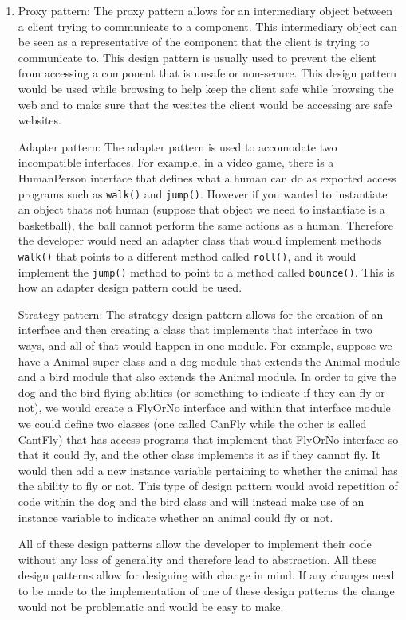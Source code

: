 \documentclass[12pt]{article}
\begin{document}
\begin{enumerate}

\item Proxy pattern: The proxy pattern allows for an intermediary object between a client trying to communicate to a component. This intermediary object can be seen as a representative of the component that the client is trying to communicate to. This design pattern is usually used to prevent the client from accessing a component that is unsafe or non-secure. This design pattern would be used while browsing to help keep the client safe while browsing the web and to make sure that the wesites the client would be accessing are safe websites.

Adapter pattern: The adapter pattern is used to accomodate two incompatible interfaces. For example, in a video game, there is a HumanPerson interface that defines what a human can do as exported access programs such as \verb|walk()| and \verb|jump()|. However if you wanted to instantiate an object thats not human (suppose that object we need to instantiate is a basketball), the ball cannot perform the same actions as a human. Therefore the developer would need an adapter class that would implement methods \verb|walk()| that points to a different method called \verb|roll()|, and it would implement the \verb|jump()| method to point to a method called \verb|bounce()|. This is how an adapter design pattern could be used.

Strategy pattern: The strategy design pattern allows for the creation of an interface and then creating a class that implements that interface in two ways, and all of that would happen in one module. For example, suppose we have a Animal super class and a dog module that extends the Animal module and a bird module that also extends the Animal module. In order to give the dog and the bird flying abilities (or something to indicate if they can fly or not), we would create a FlyOrNo interface and within that interface module we could define two classes (one called CanFly while the other is called CantFly) that has access programs that implement that FlyOrNo interface so that it could fly, and the other class implements it as if they cannot fly. It would then add a new instance variable pertaining to whether the animal has the ability to fly or not. This type of design pattern would avoid repetition of code within the dog and the bird class and will instead make use of an instance variable to indicate whether an animal could fly or not.

All of these design patterns allow the developer to implement their code without any loss of generality and therefore lead to abstraction. All these design patterns allow for designing with change in mind. If any changes need to be made to the implementation of one of these design patterns the change would not be problematic and would be easy to make.


\end{enumerate}
\end{document}
